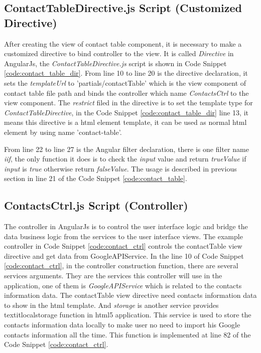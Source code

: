 \subsection{ContactTableDirective.js Script (Customized Directive)}

\par After creating the view of contact table component, it is necessary to make a customized directive to bind controller to the view. It is called \textit{Directive} in AngularJs, the \textit{ContactTableDirective.js} script is shown in Code Snippet \ref{code:contact_table_dir}. From line 10 to line 20 is the directive declaration, it sets the \textit{templateUrl} to 'partials/contactTable' which is the view component of contact table file path and binds the controller which name \textit{ContactsCtrl} to the view component. The \textit{restrict} filed in the directive is to set the template type for \textit{ContactTableDirective}, in the Code Snippet \ref{code:contact_table_dir} line 13, it means this directive is a \gls{html} element template, it can be used as normal \gls{html} element by using name 'contact-table'.

\par From line 22 to line 27 is the Angular filter declaration, there is one filter name \textit{iif}, the only function it does is to check the \textit{input} value and return \textit{trueValue} if \textit{input} is \textit{true} otherwise return \textit{falseValue}. The usage is described in previous section in line 21 of the Code Snippet \ref{code:contact_table}.

\subsection{ContactsCtrl.js Script (Controller)}

\par The controller in AngularJs is to control the user interface logic and bridge the data business logic from the services to the user interface views. The example controller in Code Snippet \ref{code:contact_ctrl} controls the contactTable view directive and get data from GoogleAPIService. In the line 10 of Code Snippet \ref{code:contact_ctrl}, in the controller construction function, there are several services arguments. They are the services this controller will use in the application, one of them is \textit{GoogleAPIService} which is related to the contacts information data. The contactTable view directive need contacts information data to show in the \gls{html} template. And \textit{storage} is another service provides \\textit{localstorage} function in \gls{html5} application. This service is used to store the contacts information data locally to make user no need to import his Google contacts information all the time. This function is implemented at line 82 of the Code Snippet \ref{code:contact_ctrl}.

